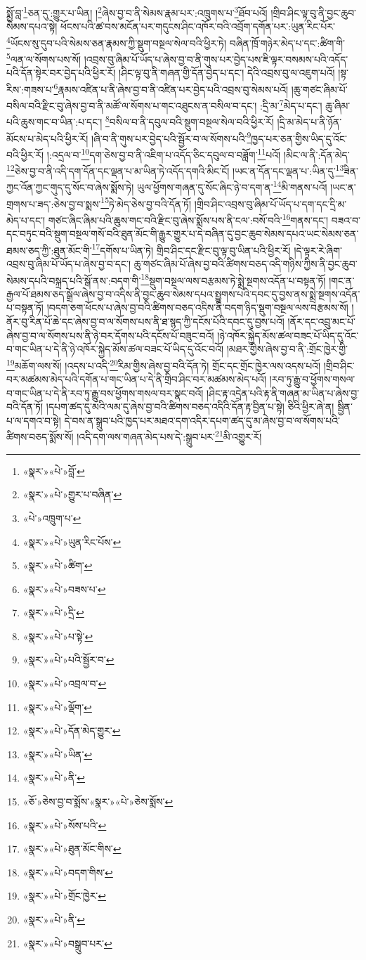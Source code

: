 སྨྱོ་བླ་\footnote{«སྣར་»«པེ་»བློ་}ཅན་དུ་:གྱུར་པ་ཡིན། །\footnote{«སྣར་»«པེ་»གྱུར་པ་བཞིན་}ཞེས་བྱ་བ་ནི་སེམས་རྣམ་པར་:འཁྲུགས་པ་\footnote{«པེ་»འཁྲུག་པ་}ཐོབ་པའོ། །གྲིབ་ཤིང་ལྟ་བུ་ནི་བྱང་ཆུབ་སེམས་དཔའ་སྟེ། ཕོངས་པའི་ཚ་བས་མངོན་པར་གདུངས་ཤིང་འཁོར་བའི་འབྲོག་དགོན་པར་:ཡུན་རིང་པོར་\footnote{«སྣར་»«པེ་»ཡུན་རིང་པོས་}ཡོངས་སུ་དུབ་པའི་སེམས་ཅན་རྣམས་ཀྱི་སྡུག་བསྔལ་སེལ་བའི་ཕྱིར་ཏེ། བཞིན་ཁྲོ་གཉེར་མེད་པ་དང་:ཚིག་གི་\footnote{«སྣར་»«པེ་»ཚིག་}ལན་ལ་སོགས་པས་སོ། །འབྲས་བུ་ཞིམ་པོ་ཡོད་པ་ཞེས་བྱ་བ་ནི་གུས་པར་བྱེད་པས་ཇི་ལྟར་བསམས་པའི་འདོད་པའི་དོན་སྟེར་བར་བྱེད་པའི་ཕྱིར་རོ། །ཤིང་ལྟ་བུ་ནི་གཞན་གྱི་དོན་བྱེད་པ་དང་། དེའི་འབྲས་བུ་ལ་འཇུག་པའོ། །སྟ་རིས་:གཟས་པ་\footnote{«སྣར་»«པེ་»བཟས་པ་}རྣམས་འཛིན་པ་ནི་ཞེས་བྱ་བ་ནི་འཛིན་པར་བྱེད་པའི་འབྲས་བུ་སེམས་པའོ། །ཆུ་གཙང་ཞིམ་པོ་བསིལ་བའི་རྫིང་བུ་ཞེས་བྱ་བ་ནི་མཚོ་ལ་སོགས་པ་གང་འཐུངས་ན་བསིལ་བ་དང་། :དྲི་མ་\footnote{«སྣར་»«པེ་»དྲི་}མེད་པ་དང་། ཆུ་ཞིམ་པའི་ཆུས་གང་བ་ཡིན་:པ་དང་། \footnote{«སྣར་»«པེ་»པ་སྟེ་}བསིལ་བ་ནི་དབུལ་བའི་སྡུག་བསྔལ་སེལ་བའི་ཕྱིར་རོ། །དྲི་མ་མེད་པ་ནི་ཉོན་མོངས་པ་མེད་པའི་ཕྱིར་རོ། །ཞི་བ་ནི་གུས་པར་བྱེད་པའི་སྦྱོར་བ་ལ་སོགས་པའི་\footnote{«སྣར་»«པེ་»པའི་སྦྱོར་བ་}ཁྱད་པར་ཅན་གྱིས་ཡིད་དུ་འོང་བའི་ཕྱིར་རོ། །:འདྲལ་བ་\footnote{«སྣར་»«པེ་»འབྲལ་བ་}དག་ཅེས་བྱ་བ་ནི་འཇིག་པ་འདོད་ཅིང་དབུལ་བ་བཟློག་\footnote{«སྣར་»«པེ་»ལྡོག་}པའོ། །མིང་ལ་ནི་:དོན་མེད་\footnote{«སྣར་»«པེ་»དོན་མེད་གྱུར་}ཅེས་བྱ་བ་ནི་འདི་དག་དོན་དང་ལྡན་པ་མ་ཡིན་ཏེ་འདོད་དགའི་མིང་ངོ། །ཡང་ན་དོན་དང་ལྡན་པ་:ཡིན་དུ་\footnote{«སྣར་»«པེ་»ཡིན་}ཟིན་ཀྱང་འོན་ཀྱང་གུད་དུ་སོང་བ་ཞེས་སྨོས་ཏེ། ཡུལ་ཕྱོགས་གཞན་དུ་སོང་ཞིང་ཉེ་བ་དག་ན་\footnote{«སྣར་»«པེ་»ནི་}མི་གནས་པའོ། །ཡང་ན་གྲགས་པ་ཟད་:ཅེས་བྱ་བ་སྨས་\footnote{«ཅོ་»ཅེས་བྱ་བ་སྨོས་«སྣར་»«པེ་»ཅེས་སྨོས་}ཏེ་མེད་ཅེས་བྱ་བའི་དོན་ཏོ། །གྲིབ་ཤིང་འབྲས་བུ་ཞིམ་པོ་ཡོད་པ་དག་དང་དྲི་མ་མེད་པ་དང་། གཙང་ཞིང་ཞིམ་པའི་ཆུས་གང་བའི་རྫིང་བུ་ཞེས་སྨོས་པས་ནི་ངལ་:བསོ་བའི་\footnote{«སྣར་»«པེ་»སོས་པའི་}གནས་དང་། བཟའ་བ་དང་བཏུང་བའི་སྡུག་བསྔལ་གསོ་བའི་ཐུན་མོང་གི་རྒྱུར་གྱུར་པ་དེ་བཞིན་དུ་བྱང་ཆུབ་སེམས་དཔའ་ཡང་སེམས་ཅན་ཐམས་ཅད་ཀྱི་:ཐུན་མོང་གི་\footnote{«སྣར་»«པེ་»ཐུན་མོང་གིས་}དགོས་པ་ཡིན་ཏེ། གྲིབ་ཤིང་དང་རྫིང་བུ་ལྟ་བུ་ཡིན་པའི་ཕྱིར་རོ། །དེ་ལྟར་རེ་ཞིག་འབྲས་བུ་ཞིམ་པོ་ཡོད་པ་ཞེས་བྱ་བ་དང་། ཆུ་གཙང་ཞིམ་པོ་ཞེས་བྱ་བའི་ཚིགས་བཅད་འདི་གཉིས་ཀྱིས་ནི་བྱང་ཆུབ་སེམས་དཔའི་བསྐྲད་པའི་སྒོ་ནས་:བདག་གི་\footnote{«སྣར་»«པེ་»བདག་གིས་}སྡུག་བསྔལ་ལས་བརྩམས་ཏེ་སྨྲེ་སྔགས་འདོན་པ་བསྟན་ཏོ། །གང་ན་རྒྱལ་པོ་ཐམས་ཅད་སྒྲོལ་ཞེས་བྱ་བ་འདིས་ནི་བྱང་ཆུབ་སེམས་དཔའ་སྤྱུགས་པའི་དབང་དུ་བྱས་ནས་སྨྲེ་སྔགས་འདོན་པ་བསྟན་ཏོ། །བདག་ཅག་ཕོངས་པ་ཞེས་བྱ་བའི་ཚིགས་བཅད་འདིས་ནི་བདག་ཉིད་སྡུག་བསྔལ་ལས་བརྩམས་སོ། །ནོར་བུ་རིན་པོ་ཆེ་དང་ཞེས་བྱ་བ་ལ་སོགས་པས་ནི་ཐ་སྙད་ཀྱི་དངོས་པོའི་དབང་དུ་བྱས་པའོ། །ནོར་དང་འབྲུ་མང་པོ་ཞེས་བྱ་བ་ལ་སོགས་པས་ནི་ཉེ་བར་དོགས་པའི་དངོས་པོ་བཟུང་བའོ། །ཉེ་འཁོར་སྐྱེད་མོས་ཚལ་བཟང་པོ་ཡིད་དུ་འོང་བ་གང་ཡིན་པ་དེ་ནི་ཉེ་འཁོར་སྐྱེད་མོས་ཚལ་བཟང་པོ་ཡིད་དུ་འོང་བའོ། །མཐར་གྱིས་ཞེས་བྱ་བ་ནི་:གྲོང་ཁྱེར་གྱི་\footnote{«སྣར་»«པེ་»གྲོང་ཁྱེར་}མཆོག་ལས་སོ། །འདས་པ་འདི་\footnote{«སྣར་»«པེ་»ནི་}རིམ་གྱིས་ཞེས་བྱ་བའི་དོན་ཏེ། གྲོང་དང་གྲོང་ཁྱེར་ལས་འདས་པའོ། །གྲིབ་ཤིང་བར་མཚམས་མེད་པའི་དགོན་པ་གང་ཡིན་པ་དེ་ནི་གྲིབ་ཤིང་བར་མཚམས་མེད་པའོ། །རབ་ཏུ་རྒྱུ་བ་ཕྱོགས་གསལ་བ་གང་ཡིན་པ་དེ་ནི་རབ་ཏུ་རྒྱུ་བས་ཕྱོགས་གསལ་བར་སྣང་བའོ། །ཤིང་རྟ་འདྲེན་པའི་རྟ་ནི་གཞན་མ་ཡིན་པ་ཞེས་བྱ་བའི་དོན་ཏོ། །དཔག་ཚད་དུ་མའི་ལམ་དུ་ཞེས་བྱ་བའི་ཚིགས་བཅད་འདིའི་དོན་རྟ་བྱིན་པ་སྟེ། ཅིའི་ཕྱིར་ཞེ་ན། སྦྱིན་པ་ལ་དགའ་བ་སྟེ། དེ་བས་ན་སྒྲུབ་པའི་ཁྱད་པར་མཐའ་དག་འདིར་དཔག་ཚད་དུ་མ་ཞེས་བྱ་བ་ལ་སོགས་པའི་ཚིགས་བཅད་སྨོས་སོ། །འདི་དག་ལས་གཞན་མེད་པས་དེ་:སྒྲུབ་པར་\footnote{«སྣར་»«པེ་»བསྒྲུབ་པར་}མི་འགྱུར་རོ། 